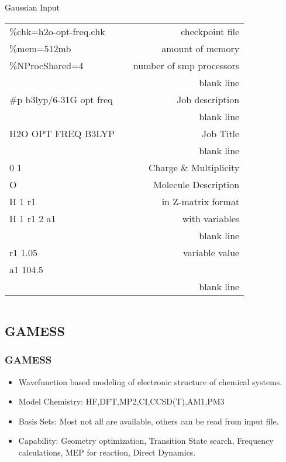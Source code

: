 \documentclass[slidestop,mathserif,compress,xcolor=svgnames]{beamer}
\begin{document}
\begin{frame}
  \begin{columns}
    \column{8.5cm}
    \vspace{-0.5cm}
    \begin{exampleblock}{Gaussian Input}
      \begin{tabular}{lcr}
	\%chk=h2o-opt-freq.chk   & & {\color{red}checkpoint file} \\
	\%mem=512mb              & & {\color{red}amount of memory} \\
	\%NProcShared=4          & & {\color{red}number of smp processors} \\
				 & & {\color{red}blank line} \\
	\#p b3lyp/6-31G opt freq & & {\color{red}Job description} \\
				 & & {\color{red}blank line} \\
	H2O OPT FREQ B3LYP       & & {\color{red}Job Title} \\
				 & & {\color{red}blank line} \\
	0 1                      & & {\color{red}Charge \& Multiplicity} \\
	O                        & & {\color{red}Molecule Description} \\
	H 1 r1                   & & {\color{red}in Z-matrix format} \\
	H 1 r1 2 a1              & & {\color{red}with variables} \\
				 & & {\color{red}blank line} \\
	r1 1.05                  & & {\color{red}variable value} \\
	a1 104.5                 & & {\color{red}} \\
				 & & {\color{red}blank line} \\
      \end{tabular}
    \end{exampleblock}
  \end{columns}
\end{frame}


\subsection{GAMESS}
\begin{frame}
  \frametitle{\small GAMESS}
  \begin{block}{}
    \begin{itemize}
      \item Wavefunction based modeling of electronic structure of chemical systems.
      \item Model Chemistry: HF,DFT,MP2,CI,CCSD(T),AM1,PM3
      \item Basis Sets: Most not all are available, others can be read from input file.
      \item Capability: Geometry optimization, Transition State search, Frequency calculations, MEP for reaction, Direct Dynamics.
    \end{itemize}
  \end{block}
\end{frame}
\end{document}
